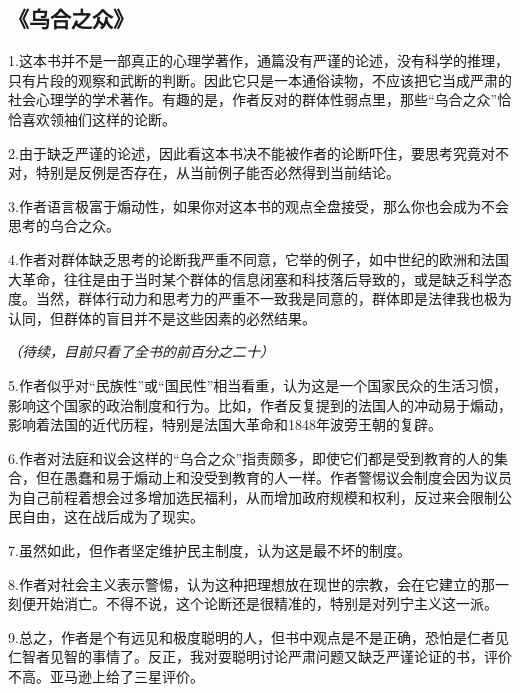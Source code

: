 \subsection{《乌合之众》}

1.这本书并不是一部真正的心理学著作，通篇没有严谨的论述，没有科学的推理，只有片段的观察和武断的判断。因此它只是一本通俗读物，不应该把它当成严肃的社会心理学的学术著作。有趣的是，作者反对的群体性弱点里，那些“乌合之众”恰恰喜欢领袖们这样的论断。

2.由于缺乏严谨的论述，因此看这本书决不能被作者的论断吓住，要思考究竟对不对，特别是反例是否存在，从当前例子能否必然得到当前结论。

3.作者语言极富于煽动性，如果你对这本书的观点全盘接受，那么你也会成为不会思考的乌合之众。

4.作者对群体缺乏思考的论断我严重不同意，它举的例子，如中世纪的欧洲和法国大革命，往往是由于当时某个群体的信息闭塞和科技落后导致的，或是缺乏科学态度。当然，群体行动力和思考力的严重不一致我是同意的，群体即是法律我也极为认同，但群体的盲目并不是这些因素的必然结果。

\emph{（待续，目前只看了全书的前百分之二十）}

5.作者似乎对“民族性”或“国民性”相当看重，认为这是一个国家民众的生活习惯，影响这个国家的政治制度和行为。比如，作者反复提到的法国人的冲动易于煽动，影响着法国的近代历程，特别是法国大革命和1848年波旁王朝的复辟。

6.作者对法庭和议会这样的“乌合之众”指责颇多，即使它们都是受到教育的人的集合，但在愚蠢和易于煽动上和没受到教育的人一样。作者警惕议会制度会因为议员为自己前程着想会过多增加选民福利，从而增加政府规模和权利，反过来会限制公民自由，这在战后成为了现实。

7.虽然如此，但作者坚定维护民主制度，认为这是最不坏的制度。

8.作者对社会主义表示警惕，认为这种把理想放在现世的宗教，会在它建立的那一刻便开始消亡。不得不说，这个论断还是很精准的，特别是对列宁主义这一派。

9.总之，作者是个有远见和极度聪明的人，但书中观点是不是正确，恐怕是仁者见仁智者见智的事情了。反正，我对耍聪明讨论严肃问题又缺乏严谨论证的书，评价不高。亚马逊上给了三星评价。